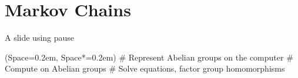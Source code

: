 \documentclass[12pt, aspectratio=149]{beamer}
\newcommand{\listSpace}{0.2em}
\theoremstyle{plain}
\begin{document}
\section{Markov Chains}
\begin{frame}[fragile]{A slide using pause}
	\begin{easylist}[itemize]
		\ListProperties(Space=\listSpace, Space*=\listSpace)
		# Represent Abelian groups on the computer \pause
		# Compute on Abelian groups \pause
		# Solve equations, factor group homomorphisms
	\end{easylist}
\end{frame}
\end{document}
